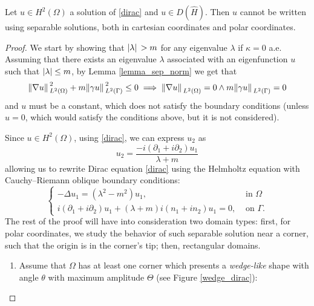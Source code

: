 \begin{proposition}\label{dirac_not_polar}
    Let \(u \in H^2(\Omega)\) a solution of \eqref{dirac} and \(u \in D(\hat{H})\). Then \(u\) cannot be written using separable solutions, both in cartesian coordinates and polar coordinates.
\end{proposition}
\begin{proof}
    We start by showing that \(\abs*{\lambda}>m\) for any eigenvalue \(\lambda\) if \(\kappa = 0\) a.e. Assuming that there exists an eigenvalue \(\lambda\) associated with an eigenfunction \(u\) such that \(\abs{\lambda} \leq m\), by Lemma \ref{lemma_sep_norm} we get that 
    \[
    \norm*{\nabla u }_{L^2(\Omega)}^2 + m \norm*{\gamma u}_{L^2(\Gamma)}^2 \leq 0 \implies \norm*{\nabla u }_{L^2(\Omega)} = 0 \land m \norm*{\gamma u}_{L^2(\Gamma)} = 0
    \]
    and \(u\) must be a constant, which does not satisfy the boundary conditions (unless \(u=0\), which would satisfy the conditions above, but it is not considered).

    Since \(u \in H^2(\Omega)\), using \eqref{dirac}, we can express \(u_2\) as
    \[
    u_2 = \frac{-i (\partial_1 + i\partial_2)u_1}{\lambda + m}    
    \]
    allowing us to rewrite Dirac equation \eqref{dirac} using the Helmholtz equation with Cauchy–Riemann oblique boundary conditions:
    \begin{equation}\label{helm_system}
        \begin{cases}
            -\Delta u_1 = (\lambda^2 - m^2)u_1, & \text{ in } \Omega\\
             i (\partial_1 + i\partial_2)u_1 + (\lambda + m)i(n_1 + i n_2)u_1 = 0, & \text{ on } \Gamma.
        \end{cases}      
    \end{equation}
    The rest of the proof will have into consideration two domain types: first, for polar coordinates, we study the behavior of such separable solution near a corner, such that the origin is in the corner's tip; then, rectangular domains.

    \begin{enumerate}
    \item Assume that \(\Omega\) has at least one corner which presents a \textit{wedge-like} shape with angle \(\theta\) with maximum amplitude \(\Theta\) (see Figure \ref{wedge_dirac}):
    
    \begin{figure}[H]
    \centering
\end{figure}
\end{enumerate}
\end{proof}
